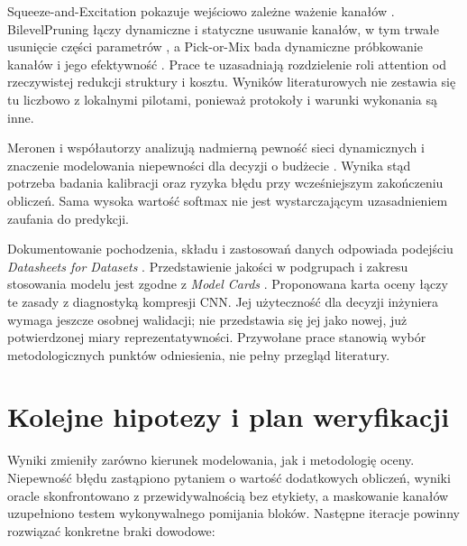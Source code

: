 \documentclass[12pt,a4paper]{article}
\begin{document}
Squeeze-and-Excitation pokazuje wejściowo zależne ważenie kanałów
\cite{senet}. BilevelPruning łączy dynamiczne i statyczne usuwanie kanałów,
w tym trwałe usunięcie części parametrów \cite{bilevel}, a Pick-or-Mix
bada dynamiczne próbkowanie kanałów i jego efektywność \cite{pix}.
Prace te uzasadniają rozdzielenie roli attention od rzeczywistej redukcji
struktury i kosztu. Wyników literaturowych nie zestawia się tu liczbowo
z lokalnymi pilotami, ponieważ protokoły i warunki wykonania są inne.

Meronen i współautorzy analizują nadmierną pewność sieci dynamicznych
i znaczenie modelowania niepewności dla decyzji o budżecie
\cite{overconfidence}. Wynika stąd potrzeba badania kalibracji oraz
ryzyka błędu przy wcześniejszym zakończeniu obliczeń. Sama wysoka wartość
softmax nie jest wystarczającym uzasadnieniem zaufania do predykcji.

Dokumentowanie pochodzenia, składu i zastosowań danych odpowiada podejściu
\emph{Datasheets for Datasets} \cite{datasheets}. Przedstawienie jakości
w podgrupach i zakresu stosowania modelu jest zgodne z
\emph{Model Cards} \cite{modelcards}. Proponowana karta oceny łączy te
zasady z diagnostyką kompresji CNN. Jej użyteczność dla decyzji inżyniera
wymaga jeszcze osobnej walidacji; nie przedstawia się jej jako nowej,
już potwierdzonej miary reprezentatywności. Przywołane prace stanowią
wybór metodologicznych punktów odniesienia, nie pełny przegląd literatury.

\section{Kolejne hipotezy i plan weryfikacji}

Wyniki zmieniły zarówno kierunek modelowania, jak i metodologię oceny.
Niepewność błędu zastąpiono pytaniem o wartość dodatkowych obliczeń,
wyniki oracle skonfrontowano z przewidywalnością bez etykiety, a maskowanie
kanałów uzupełniono testem wykonywalnego pomijania bloków. Następne
iteracje powinny rozwiązać konkretne braki dowodowe:
\end{document}
